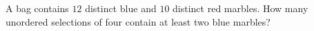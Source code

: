 A bag contains $12$ distinct blue and $10$ distinct red marbles. How many unordered selections of four contain at least two blue marbles?
